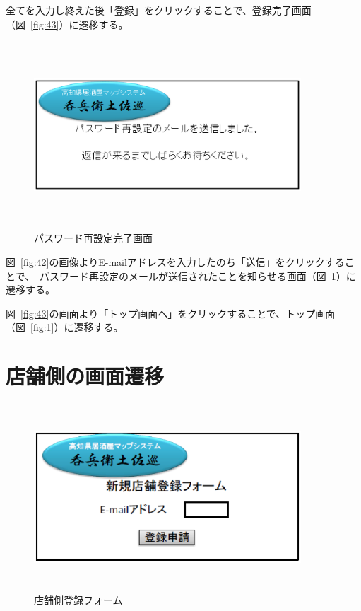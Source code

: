 \documentclass[a4j,titlepage]{jarticle}
\begin{document}
全てを入力し終えた後「登録」をクリックすることで、登録完了画面（図~\ref{fig:43}）に遷移する。



\begin {figure}[!htbp]
    \begin{center}
    \includegraphics [height=7cm, width=10cm]{44.eps}
    \caption {パスワード再設定完了画面}
    \label {fig:44}
    \end{center}
\end {figure}



図~\ref{fig:42}の画像よりE-mailアドレスを入力したのち「送信」をクリックすることで、　パスワード再設定のメールが送信されたことを知らせる画面（図~\ref{fig:44}）に遷移する。



図~\ref{fig:43}の画面より「トップ画面へ」をクリックすることで、トップ画面（図~\ref{fig:1}）に遷移する。



\section{店舗側の画面遷移}



\begin {figure}[!htbp]
    \begin{center}
    \includegraphics [height=7cm, width=10cm]{45.eps}
    \caption {店舗側登録フォーム}
    \label {fig:45}
    \end{center}
\end {figure}
\end{document}

